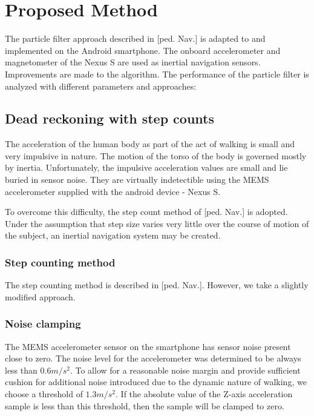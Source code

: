 \chapter{Proposed Method\label{chap:proposed_method}}
The particle filter approach described in [ped. Nav.] is adapted to and
implemented on the Android smartphone. The onboard accelerometer and
magnetometer of the Nexus S are used as inertial navigation sensors.
Improvements are made to the algorithm. The performance of the particle filter
is analyzed with different parameters and approaches:

\section{Dead reckoning with step counts}

The acceleration of the human body as part of the act of walking is small and 
very impulsive in nature. The motion of the torso of the body is governed 
mostly by inertia. Unfortunately, the impulsive acceleration values are small 
and lie buried in sensor noise. They are virtually indetectible using the MEMS 
accelerometer supplied with the android device - Nexus S.

To overcome this difficulty, the step count method of [ped. Nav.] is adopted. 
Under the assumption that step size varies very little over the course of 
motion of the subject, an inertial navigation system may be created.

\subsection{Step counting method}

The step counting method is described in [ped. Nav.]. However, we take a
slightly modified approach.  

\subsection{Noise clamping\label{sec:NoiseClamping}}

The MEMS accelerometer sensor on the smartphone has sensor noise present close
to zero. The noise level for the accelerometer was determined to be always less
than $0.6 m/s^2$. To allow for a reasonable noise margin and provide sufficient
cushion for additional noise introduced due to the dynamic nature of walking, we
choose a threshold of $1.3 m/s^2$. If the absolute value of the Z-axis
acceleration sample is less than this threshold, then the sample will be clamped
to zero. 

